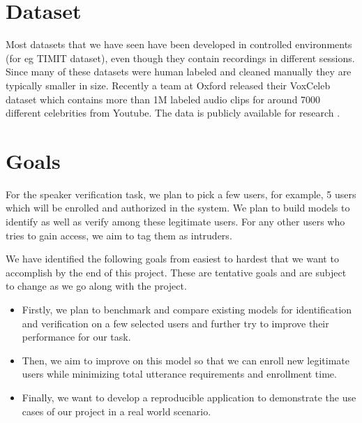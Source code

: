\documentclass[letterpaper]{article}
\begin{document}

\section{Dataset}
Most datasets that we have seen have been developed in controlled environments (for eg TIMIT dataset), even though they contain recordings in different sessions. Since many of these datasets were human labeled and cleaned manually they are typically smaller in size. Recently a team at Oxford released their VoxCeleb dataset which contains more than 1M labeled audio clips for around 7000 different celebrities from Youtube. The data is publicly available for research \cite{voxCeleb}.



\section{Goals}

For the speaker verification task, we plan to pick a few users, for example, 5 users which will be enrolled and authorized in the system. We plan to build models to identify as well as verify among these legitimate users. For any other users who tries to gain access, we aim to tag them as intruders.


We have identified the following goals from easiest to hardest that we want to accomplish by the end of this project. These are tentative goals and are subject to change as we go along with the project.

\begin{itemize}
	\item Firstly, we plan to benchmark and compare existing models for identification and verification on a few selected users and further try to improve their performance for our task.
	\item Then, we aim to improve on this model so that we can enroll new legitimate users while minimizing total utterance requirements and enrollment time.
	\item Finally, we want to develop a reproducible application to demonstrate the use cases of our project in a real world scenario.
	
\end{itemize}
\end{document}
